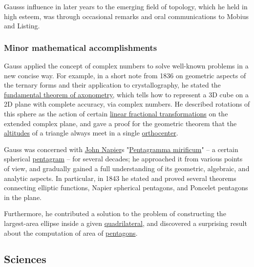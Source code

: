 Gauss\textquotesingle s influence in later years to the emerging field of topology, which he held in high esteem, was through occasional remarks and oral communications to Mobius and Listing.


\subsubsection{Minor mathematical accomplishments}\label{Minor_mathematical_accomplishments}

Gauss applied the concept of complex numbers to solve well-known problems in a new concise way. For example, in a short note from 1836 on geometric aspects of the ternary forms and their application to crystallography, he stated the \href{https://en.wikipedia.org/wiki/Axonometry}{fundamental theorem of axonometry}, which tells how to represent a 3D cube on a 2D plane with complete accuracy, via complex numbers. He described rotations of this sphere as the action of certain \href{https://en.wikipedia.org/wiki/Mobius_transformation}{linear fractional transformations} on the extended complex plane, and gave a proof for the geometric theorem that the \href{https://en.wikipedia.org/wiki/Altitude_(triangle)}{altitudes} of a triangle always meet in a single \href{https://en.wikipedia.org/wiki/Orthocenter}{orthocenter}.

Gauss was concerned with \href{https://en.wikipedia.org/wiki/John_Napier}{John Napier}\textquotesingle s "\href{https://en.wikipedia.org/wiki/Pentagramma_mirificum}{Pentagramma mirificum}" -- a certain spherical \href{https://en.wikipedia.org/wiki/Pentagram}{pentagram} -- for several decades; he approached it from various points of view, and gradually gained a full understanding of its geometric, algebraic, and analytic aspects. In particular, in 1843 he stated and proved several theorems connecting elliptic functions, Napier spherical pentagons, and Poncelet pentagons in the plane.

Furthermore, he contributed a solution to the problem of constructing the largest-area ellipse inside a given \href{https://en.wikipedia.org/wiki/Quadrilateral}{quadrilateral}, and discovered a surprising result about the computation of area of \href{https://en.wikipedia.org/wiki/Pentagon}{pentagons}.


\subsection{Sciences}\label{Sciences}


